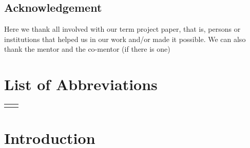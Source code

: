 \documentclass[12pt,a4paper,titlepage,openany]{report}
\begin{document}

\newpage
\section*{Acknowledgement}

Here we thank all involved with our term project paper, that is, persons or institutions that helped us in our work and/or made it possible.
We can also thank the mentor and the co-mentor (if there is one)

\newpage

\tableofcontents
{}
\newpage
\listoftables
{}
\newpage
\listoffigures
{}
\newpage
\renewcommand{\cftdot}{}
\listofappendices
\thispagestyle{fancy}
\newpage

\chapter*{List of Abbreviations}
\thispagestyle{fancyplain}
\begin{longtable}{@{}p{1cm}@{}p{\dimexpr\textwidth-1cm\relax}@{}}
\nomenclature{{\it i.e.}}{that is}
\nomenclature{{\it e.g.}}{for example}
\end{longtable}
\newpage

\normalsize


% 
% 
\chapter{Introduction}
\thispagestyle{fancy}
\end{document}
